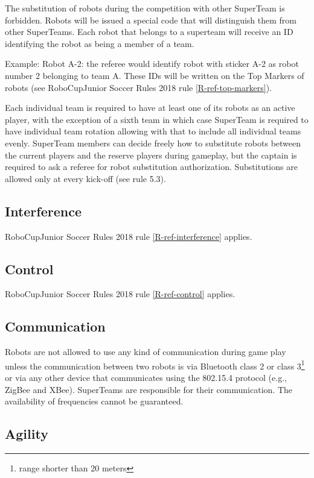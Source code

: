 \documentclass{article}
\begin{document}
The substitution of robots during the competition with other SuperTeam is
forbidden. Robots will be issued a special code that will distinguish them from
other SuperTeams. Each robot that belongs to a superteam will receive an ID
identifying the robot as being a member of a team.

Example: Robot A-2: the referee would identify robot with sticker A-2 as robot
number 2 belonging to team A. These IDs will be written on the Top Markers of
robots (see RoboCupJunior Soccer Rules 2018 rule \ref{R-ref-top-markers}).


Each individual team is required to have at least one of its robots as an
active player, with the exception of a sixth team in which case SuperTeam is
required to have individual team rotation allowing with that to include all
individual teams evenly. SuperTeam members can decide freely how to substitute
robots between the current players and the reserve players during gameplay, but
the captain is required to ask a referee for robot substitution authorization.
Substitutions are allowed only at every kick-off (see rule 5.3).

\subsection{ Interference \label{ref-020}}


RoboCupJunior Soccer Rules 2018 rule \ref{R-ref-interference} applies.


\subsection{ Control \label{ref-021}}

RoboCupJunior Soccer Rules 2018 rule \ref{R-ref-control} applies.

\subsection{ Communication \label{ref-022}}

Robots are not allowed to use any kind of communication during game play unless
the communication between two robots is via Bluetooth class 2 or class
3\footnote{range shorter than 20 meters} or via any other device that
communicates using the 802.15.4 protocol (e.g., ZigBee and XBee). SuperTeams
are responsible for their communication. The availability of frequencies cannot
be guaranteed.

\subsection{Agility \label{ref-023}}
\end{document}
